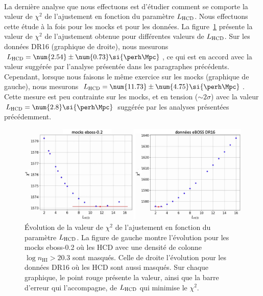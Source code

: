 \paragraph{}
La dernière analyse que nous effectuons est d'étudier comment se comporte la valeur de $\chi^2$ de l'ajustement en fonction du paramètre $L_{\textsc{HCD}}$. Nous effectuons cette étude à la fois pour les mocks et pour les données.
La figure~\ref{fig:L0_free} présente la valeur de $\chi^2$ de l'ajustement obtenue pour différentes valeurs de $L_{\textsc{HCD}}$.
Sur les données DR16 (graphique de droite), nous mesurons $L_{\textsc{HCD}} = \num{2.54} \pm \num{0.73} \si{\perh\Mpc}$, ce qui est en accord avec la valeur suggérée par l'analyse présentée dans les paragraphes précédents.
Cependant, lorsque nous faisons le même exercice sur les mocks (graphique de gauche), nous mesurons $L_{\textsc{HCD}} = \num{11.73} \pm \num{4.75} \si{\perh\Mpc}$. Cette mesure est peu contrainte sur les mocks, et en tension ($\sim 2 \sigma$) avec la valeur $L_{\textsc{HCD}} = \num{2.8} \si{\perh\Mpc}$ suggérée par les analyses présentées précédemment.

\begin{figure}
  \centering
  \includegraphics[scale=0.36]{L0_free}
  \caption{Évolution de la valeur de $\chi^2$ de l'ajustement en fonction du paramètre $L_{\textsc{HCD}}$. La figure de gauche montre l'évolution pour les mocks eboss-0.2 où les HCD avec une densité de colonne $\log n_{\mathrm{HI}} > \num{20.3}$ sont masqués. Celle de droite l'évolution pour les données DR16 où les HCD sont aussi masqués. Sur chaque graphique, le point rouge présente la valeur, ainsi que la barre d'erreur qui l'accompagne, de $L_{\textsc{HCD}}$ qui minimise le $\chi^2$.}
  \label{fig:L0_free}
\end{figure}


